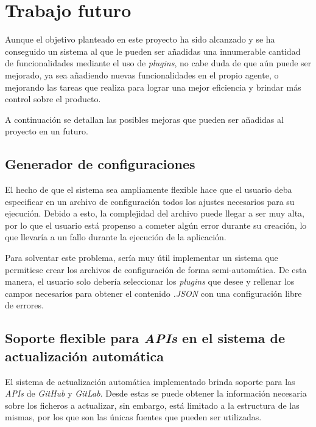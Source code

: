 \section{Trabajo futuro}
        
    Aunque el objetivo planteado en este proyecto ha sido alcanzado y se ha conseguido un sistema al que le pueden ser añadidas una innumerable cantidad de funcionalidades mediante el uso de \textit{plugins}, no cabe duda de que aún puede ser mejorado, ya sea añadiendo nuevas funcionalidades en el propio agente, o mejorando las tareas que realiza para lograr una mejor eficiencia y brindar más control sobre el producto.
    
    A continuación se detallan las posibles mejoras que pueden ser añadidas al proyecto en un futuro.
            
    \subsection{Generador de configuraciones}
        El hecho de que el sistema sea ampliamente flexible hace que el usuario deba especificar en un archivo de configuración todos los ajustes necesarios para su ejecución. Debido a esto, la complejidad del archivo puede llegar a ser muy alta, por lo que el usuario está propenso a cometer algún error durante su creación, lo que llevaría a un fallo durante la ejecución de la aplicación.
        
        Para solventar este problema, sería muy útil implementar un sistema que permitiese crear los archivos de configuración de forma semi-automática. De esta manera, el usuario solo debería seleccionar los \textit{plugins} que desee y rellenar los campos necesarios para obtener el contenido \textit{.JSON} con una configuración libre de errores.
        
    \subsection{Soporte flexible para \textit{APIs} en el sistema de actualización automática}
        El sistema de actualización automática implementado brinda soporte para las \textit{APIs} de \textit{GitHub} y \textit{GitLab}. Desde estas se puede obtener la información necesaria sobre los ficheros a actualizar, sin embargo, está limitado a la estructura de las mismas, por los que son las únicas fuentes que pueden ser utilizadas.
        

